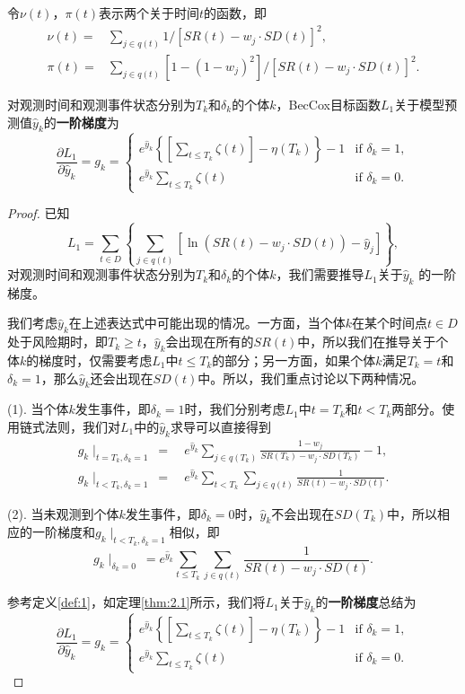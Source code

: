 \begin{definition}\label{def:2}
令$\nu(t)$，$\pi(t)$表示两个关于时间$t$的函数，即\[
\begin{split}
\nu(t) =& \sum_{j\in q(t)} 1/[SR(t) - w_j\cdot SD(t)]^2, \\
\pi(t)  =& \sum_{j\in q(t)} [1-(1-w_j)^2]/[SR(t) - w_j\cdot SD(t)]^2.
\end{split}
\]
\end{definition}

\begin{theorem}\label{thm:2.1}
对观测时间和观测事件状态分别为$T_k$和$\delta_k$的个体$k$，BecCox目标函数$L_1$关于模型预测值$\hat{y}_k$的\textbf{一阶梯度}为$$
\frac{\partial L_1}{\partial \hat{y}_k} = g_k = 
\begin{cases}
e^{\hat{y}_k} \left\{ \left[\sum_{t\le T_k} \zeta(t)\right] - \eta(T_k) \right\} - 1 & \text{if } \delta_k = 1,\\
e^{\hat{y}_k} \sum_{t\le T_k} \zeta(t) & \text{if } \delta_k = 0.
\end{cases}
$$
\end{theorem}

\begin{proof}
已知$$L_1 = \sum_{t\in D} \left\{ \sum_{j\in q(t)} [\ln(SR(t)-w_j\cdot SD(t))-\hat{y}_j] \right\},$$ 对观测时间和观测事件状态分别为$T_k$和$\delta_k$的个体$k$，我们需要推导$L_1$关于$\hat{y}_k$ 的一阶梯度。

我们考虑$\hat{y}_k$在上述表达式中可能出现的情况。一方面，当个体$k$在某个时间点$t\in D$处于风险期时，即$T_k\ge t$，$\hat{y}_k$会出现在所有的$SR(t)$中，所以我们在推导关于个体$k$的梯度时，仅需要考虑$L_1$中$t \le T_k$的部分；另一方面，如果个体$k$满足$T_k=t$和$\delta_k=1$，那么$\hat{y}_k$还会出现在$SD(t)$中。所以，我们重点讨论以下两种情况。

(1). 当个体$k$发生事件，即$\delta_k=1$时，我们分别考虑$L_1$中$t=T_k$和$t<T_k$两部分。使用链式法则，我们对$L_1$中的$\hat{y}_k$求导可以直接得到\[
\begin{split}
g_k\mid_{t=T_k,\delta_k=1} \ =\ & e^{\hat{y}_k}\sum_{j\in q(T_k)} \frac{1-w_j}{SR(T_k) - w_j\cdot SD(T_k)} - 1, \\
g_k\mid_{t<T_k,\delta_k=1} \ =\ & e^{\hat{y}_k}\sum_{t<T_k} \sum_{j\in q(t)} \frac{1}{SR(t) - w_j\cdot SD(t)}.
\end{split}
\]

(2). 当未观测到个体$k$发生事件，即$\delta_k=0$时，$\hat{y}_k$不会出现在$SD(T_k)$中，所以相应的一阶梯度和$g_k\mid_{t<T_k,\delta_k=1}$相似，即$$
g_k\mid_{\delta_k=0} \ = e^{\hat{y}_k}\sum_{t\le T_k} \sum_{j\in q(t)} \frac{1}{SR(t) - w_j\cdot SD(t)}.
$$

参考定义\ref{def:1}，如定理\ref{thm:2.1}所示，我们将$L_1$关于$\hat{y}_k$的\textbf{一阶梯度}总结为$$
\frac{\partial L_1}{\partial \hat{y}_k} = g_k = 
\begin{cases}
e^{\hat{y}_k} \left\{ \left[\sum_{t\le T_k} \zeta(t)\right] - \eta(T_k) \right\} - 1 & \text{if } \delta_k = 1,\\
e^{\hat{y}_k} \sum_{t\le T_k} \zeta(t) & \text{if } \delta_k = 0.
\end{cases}
$$
\end{proof}

